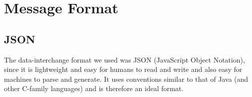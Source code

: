 \chapter{Message Format}
\section{JSON}
The data-interchange format we used was JSON (JavaScript Object Notation), since it is lightweight and easy for humans to read and write and also easy for machines to parse and generate. It uses conventions similar to that of Java (and other C-family languages) and is therefore an ideal format.